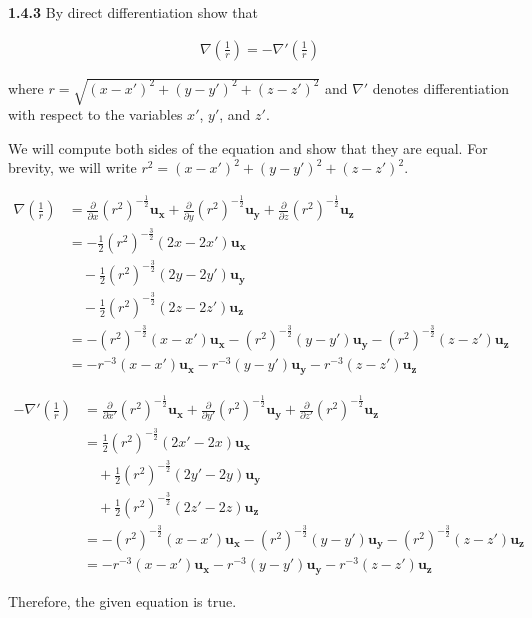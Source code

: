 \documentclass{article}
\begin{document}
\textbf{1.4.3} By direct differentiation show that

\begin{equation*}
	\begin{split}
		\nabla \left(\frac{1}{r}\right) = -\nabla ' \left(\frac{1}{r}\right)
	\end{split}
\end{equation*}

where $r = \sqrt{{(x-x')}^2 + {(y-y')}^2 + {(z-z')}^2}$ and $\nabla '$ denotes differentiation with respect to the
variables $x'$, $y'$, and $z'$.

\vspace{24pt}

We will compute both sides of the equation and show that they are equal. For brevity, we will write $r^2 = {(x-x')}^2 +
	{(y-y')}^2 + {(z-z')}^2$.

\begin{equation*}
	\begin{split}
		\nabla \left(\frac{1}{r}\right) & = \frac{\partial}{\partial x}{(r^2)}^{-\frac{1}{2}}\mathbf{u_x} + \frac{\partial}{\partial y}{(r^2)}^{-\frac{1}{2}}\mathbf{u_y} + \frac{\partial}{\partial z}{(r^2)}^{-\frac{1}{2}}\mathbf{u_z} \\
		& = -\frac{1}{2}{(r^2)}^{-\frac{3}{2}}(2x - 2x')\mathbf{u_x} \\
		& \quad - \frac{1}{2}{(r^2)}^{-\frac{3}{2}}(2y - 2y')\mathbf{u_y} \\
		& \quad - \frac{1}{2}{(r^2)}^{-\frac{3}{2}}(2z - 2z')\mathbf{u_z} \\
		& = -{(r^2)}^{-\frac{3}{2}}(x - x')\mathbf{u_x} - {(r^2)}^{-\frac{3}{2}}(y - y')\mathbf{u_y} - {(r^2)}^{-\frac{3}{2}}(z - z')\mathbf{u_z} \\
		& = -r^{-3}(x - x')\mathbf{u_x} - r^{-3}(y - y')\mathbf{u_y} - r^{-3}(z - z')\mathbf{u_z}
	\end{split}
\end{equation*}

\begin{equation*}
	\begin{split}
		-\nabla ' \left(\frac{1}{r}\right) & = \frac{\partial}{\partial x'}{(r^2)}^{-\frac{1}{2}}\mathbf{u_x} + \frac{\partial}{\partial y'}{(r^2)}^{-\frac{1}{2}}\mathbf{u_y} + \frac{\partial}{\partial z'}{(r^2)}^{-\frac{1}{2}}\mathbf{u_z} \\
		& = \frac{1}{2}{(r^2)}^{-\frac{3}{2}}(2x' - 2x)\mathbf{u_x} \\
		& \quad + \frac{1}{2}{(r^2)}^{-\frac{3}{2}}(2y' - 2y)\mathbf{u_y} \\
		& \quad + \frac{1}{2}{(r^2)}^{-\frac{3}{2}}(2z' - 2z)\mathbf{u_z} \\
		& = -{(r^2)}^{-\frac{3}{2}}(x - x')\mathbf{u_x} - {(r^2)}^{-\frac{3}{2}}(y - y')\mathbf{u_y} - {(r^2)}^{-\frac{3}{2}}(z - z')\mathbf{u_z} \\
		& = -r^{-3}(x - x')\mathbf{u_x} - r^{-3}(y - y')\mathbf{u_y} - r^{-3}(z - z')\mathbf{u_z}
	\end{split}
\end{equation*}

Therefore, the given equation is true.
\end{document}

